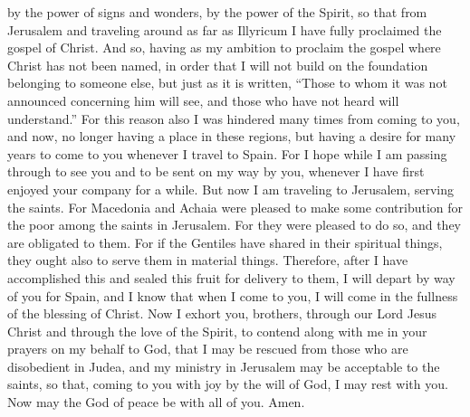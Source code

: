 \begin{biblechapter}
\verse by the power of signs and wonders, by the power of the Spirit, so that from Jerusalem and traveling around as far as Illyricum I have fully proclaimed the gospel of Christ.
\verse And so, having as my ambition to proclaim the gospel where Christ has not been named, in order that I will not build on the foundation belonging to someone else,
\verse but just as it is written, “Those to whom it was not announced concerning him will see, 
and those who have not heard will understand.”
 For this reason also I was hindered many times from coming to you,
\verse and now, no longer having a place in these regions, but having a desire for many years to come to you
\verse whenever I travel to Spain. For I hope while I am passing through to see you and to be sent on my way by you, whenever I have first enjoyed your company for a while.
\verse But now I am traveling to Jerusalem, serving the saints.
\verse For Macedonia and Achaia were pleased to make some contribution for the poor among the saints in Jerusalem.
\verse For they were pleased to do so, and they are obligated to them. For if the Gentiles have shared in their spiritual things, they ought also to serve them in material things.
\verse Therefore, after I have accomplished this and sealed this fruit for delivery to them, I will depart by way of you for Spain,
\verse and I know that when I come to you, I will come in the fullness of the blessing of Christ.
\verse Now I exhort you, brothers, through our Lord Jesus Christ and through the love of the Spirit, to contend along with me in your prayers on my behalf to God,
\verse that I may be rescued from those who are disobedient in Judea, and my ministry in Jerusalem may be acceptable to the saints,
\verse so that, coming to you with joy by the will of God, I may rest with you.
\verse Now may the God of peace be with all of you. Amen.
\end{biblechapter}

